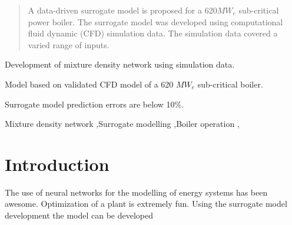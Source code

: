 \documentclass[a4paper,fleqn]{cas-sc}
\begin{document}


\begin{abstract}
A data-driven surrogate model is proposed for a 620$MW_e$ sub-critical power boiler. The surrogate model was developed using computational fluid dynamic (CFD) simulation data. The simulation data covered a varied range of inputs.
\end{abstract}


\begin{highlights}
\item Development of mixture density network using simulation data.
\item Model based on validated CFD model of a 620 $MW_e$ sub-critical boiler.
\item Surrogate model prediction errors are below 10\%.
\end{highlights}

\begin{keywords}
Mixture density network \sep Surrogate modelling \sep Boiler operation \sep 
\end{keywords}

\maketitle

\section{Introduction}\label{intro}

The use of neural networks for the modelling of energy systems has been awesome. Optimization of a plant is extremely fun. Using the surrogate model development the model can be developed
\end{document}
